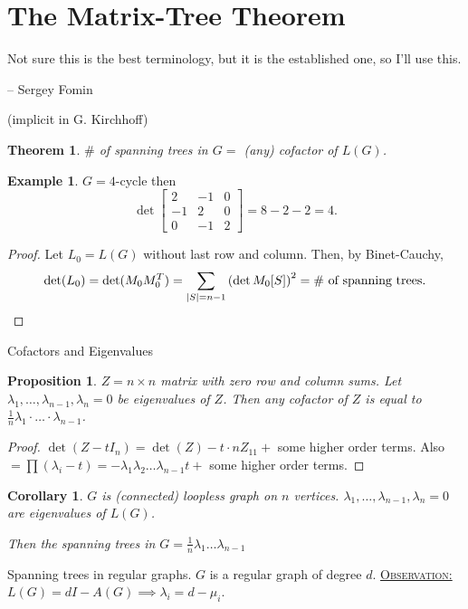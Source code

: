 \documentclass{report}
\newcommand{\fancyem}[1]{\underline{\textsc{#1}}}
\newtheorem{theorem}{Theorem}[section]
\newtheorem{corollary}{Corollary}[section]
\newtheorem{proposition}{Proposition}[section]
\theoremstyle{definition}
\newtheorem{example}{Example}[section]
\theoremstyle{remark}
\numberwithin{equation}{section}
\begin{document}
\section{The Matrix-Tree Theorem}
\epigraph{Not sure this is the best terminology, but it is the established one, so I'll use this.}{-- \textup{ Sergey Fomin}}

(implicit in G. Kirchhoff)
\begin{theorem}
    $\#$ of spanning trees in $G = $ (any) cofactor of $L(G)$.
\end{theorem}
\begin{example}
    $G = 4$-cycle then 
    \[
        \det \begin{bmatrix}
            2 & -1 & 0 \\
            -1 & 2 & 0 \\
            0 & -1 & 2
        \end{bmatrix} = 8 - 2 - 2 = 4.   
    \]
\end{example}
\begin{proof}
    Let $L_0 = L(G)$ without last row and column. Then, by Binet-Cauchy,
    \[\det(L_0) = \det (M_0M_0^T) = \sum_{|S| = n - 1} \left(\det M_0[S]\right)^2 = \# \text{ of spanning trees}.\qedhere\]
\end{proof}

Cofactors and Eigenvalues
\begin{proposition}
    $Z = n \times n$ matrix with zero row and column sums.
    Let $\lambda_1, \ldots, \lambda_{n-1},\lambda_n = 0$ be eigenvalues of $Z$. Then any cofactor of $Z$ is equal to $\frac{1}{n}\lambda_1 \cdot \ldots \cdot \lambda_{n-1}$. 
\end{proposition}
\begin{proof}
    $\det(Z - tI_n) = \det(Z) - t \cdot nZ_{11} + $ some higher order terms.
    Also $=\prod(\lambda_i - t) = - \lambda_1 \lambda_2 \ldots \lambda_{n-1}t + $ some higher order terms.
\end{proof}

\begin{corollary}
    $G$ is (connected) loopless graph on $n$ vertices. $\lambda_1, \ldots, \lambda_{n-1}, \lambda_n = 0$ are eigenvalues of $L(G)$.

    Then the spanning trees in $G = \frac{1}{n}\lambda_1 \ldots \lambda_{n-1}$ 
\end{corollary}

Spanning trees in regular graphs.
$G$ is a regular graph of degree $d$.
\fancyem{Observation:} $L(G) = dI - A(G) \implies \lambda_i = d - \mu_i$.
\end{document}
